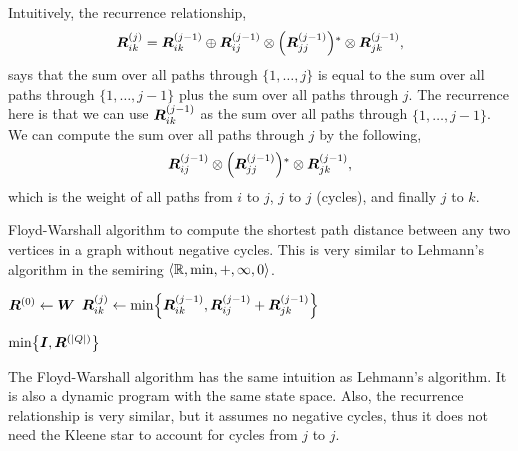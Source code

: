 Intuitively, the recurrence relationship, \[
    \mat{R}_{ik}^{(j)} = \mat{R}_{ik}^{(j-1)} \oplus \mat{R}_{ij}^{(j-1)} \otimes \lft( \mat{R}_{jj}^{(j-1)} \rgt)^* \otimes \mat{R}_{jk}^{(j-1)}
    ,\]
says that the sum over all paths through $\{ 1,\ldots,j \}$ is equal to the sum
over all paths through $\{ 1,\ldots,j-1 \}$ plus the sum over all paths through
$j$. The recurrence here is that we can use $\bm{R}_{ik}^{(j-1)}$ as the sum
over all paths through $\{ 1,\ldots,j-1 \}$. We can compute the sum over all
paths through $j$ by the following, \[
    \mat{R}_{ij}^{(j-1)} \otimes \lft( \mat{R}_{jj}^{(j-1)} \rgt)^* \otimes \mat{R}_{jk}^{(j-1)}
    ,\]
which is the weight of all paths from $i$ to $j$, $j$ to $j$ (cycles), and
finally $j$ to $k$.

\begin{algorithm}
    \caption{Floyd-Warshall algorithm to compute the shortest path distance
        between any two vertices in a graph without negative cycles. This is very
        similar to Lehmann's algorithm in the semiring $\langle \mathbb{R}, \min, +, \infty,
            0 \rangle$.}
    \label{alg:floyd-warshall}

    \begin{algorithmic}[1]
        \State $\bm{R}^{(0)} \gets \bm{W}$
        \State $\mat{R}_{ik}^{(j)} \gets \min \lft\{ \mat{R}_{ik}^{(j-1)}, \mat{R}_{ij}^{(j-1)} + \mat{R}_{jk}^{(j-1)} \rgt\}$
        \EndFor
        \EndFor
        \EndFor

        \State \Return $\min \lft\{ \mat{I}, \mat{R}^{(|Q|)} \rgt\}$
        \EndFunction
    \end{algorithmic}
\end{algorithm}

The Floyd-Warshall algorithm \citep{floyd1962algorithm,warshall1962theorem} has
the same intuition as Lehmann's algorithm. It is also a dynamic program with
the same state space. Also, the recurrence relationship is very similar, but it
assumes no negative cycles, thus it does not need the Kleene star to account
for cycles from $j$ to $j$.
